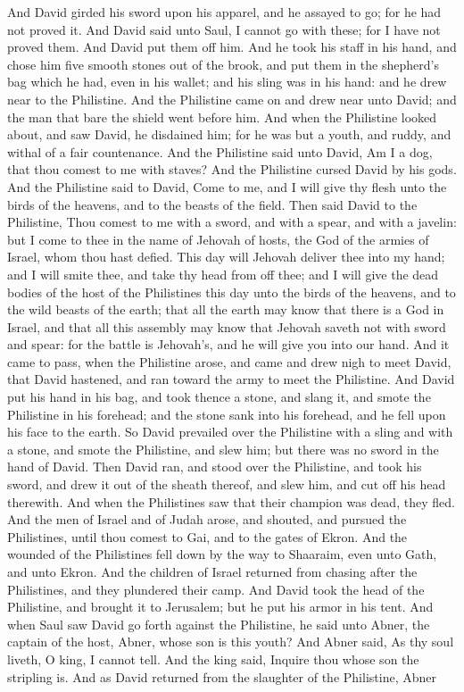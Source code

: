And David girded his sword upon his apparel, and he assayed to go; for he had not proved it. And David said unto Saul, I cannot go with these; for I have not proved them. And David put them off him. And he took his staff in his hand, and chose him five smooth stones out of the brook, and put them in the shepherd’s bag which he had, even in his wallet; and his sling was in his hand: and he drew near to the Philistine.  And the Philistine came on and drew near unto David; and the man that bare the shield went before him. And when the Philistine looked about, and saw David, he disdained him; for he was but a youth, and ruddy, and withal of a fair countenance. And the Philistine said unto David, Am I a dog, that thou comest to me with staves? And the Philistine cursed David by his gods. And the Philistine said to David, Come to me, and I will give thy flesh unto the birds of the heavens, and to the beasts of the field. Then said David to the Philistine, Thou comest to me with a sword, and with a spear, and with a javelin: but I come to thee in the name of Jehovah of hosts, the God of the armies of Israel, whom thou hast defied. This day will Jehovah deliver thee into my hand; and I will smite thee, and take thy head from off thee; and I will give the dead bodies of the host of the Philistines this day unto the birds of the heavens, and to the wild beasts of the earth; that all the earth may know that there is a God in Israel, and that all this assembly may know that Jehovah saveth not with sword and spear: for the battle is Jehovah’s, and he will give you into our hand. And it came to pass, when the Philistine arose, and came and drew nigh to meet David, that David hastened, and ran toward the army to meet the Philistine. And David put his hand in his bag, and took thence a stone, and slang it, and smote the Philistine in his forehead; and the stone sank into his forehead, and he fell upon his face to the earth.  So David prevailed over the Philistine with a sling and with a stone, and smote the Philistine, and slew him; but there was no sword in the hand of David. Then David ran, and stood over the Philistine, and took his sword, and drew it out of the sheath thereof, and slew him, and cut off his head therewith. And when the Philistines saw that their champion was dead, they fled. And the men of Israel and of Judah arose, and shouted, and pursued the Philistines, until thou comest to Gai, and to the gates of Ekron. And the wounded of the Philistines fell down by the way to Shaaraim, even unto Gath, and unto Ekron. And the children of Israel returned from chasing after the Philistines, and they plundered their camp. And David took the head of the Philistine, and brought it to Jerusalem; but he put his armor in his tent.  And when Saul saw David go forth against the Philistine, he said unto Abner, the captain of the host, Abner, whose son is this youth? And Abner said, As thy soul liveth, O king, I cannot tell. And the king said, Inquire thou whose son the stripling is. And as David returned from the slaughter of the Philistine, Abner 